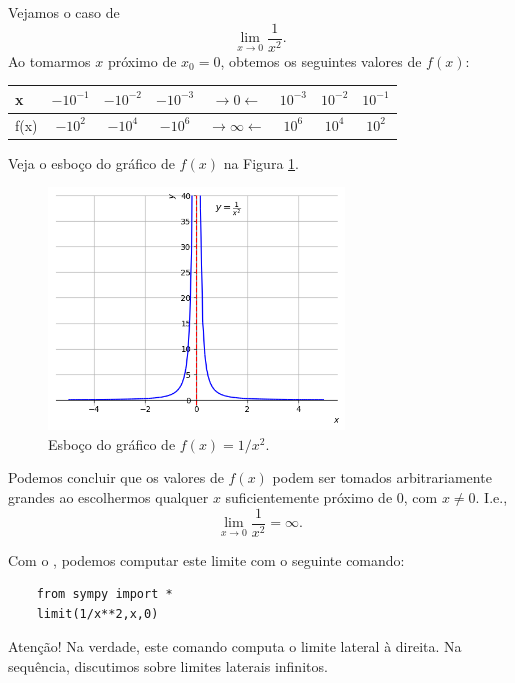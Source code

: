 \begin{ex}
  Vejamos o caso de
  \begin{equation}
    \lim_{x\to 0} \frac{1}{x^2}.
  \end{equation}
  Ao tomarmos $x$ próximo de $x_0=0$, obtemos os seguintes valores de $f(x)$:
  \begin{center}
    \begin{tabular}[H]{l|ccc|c|ccc}
      x & $-10^{-1}$ & $-10^{-2}$ & $-10^{-3}$ & $\rightarrow 0 \leftarrow$ & $10^{-3}$ & $10^{-2}$ & $10^{-1}$ \\\hline
      f(x) & $-10^{2}$ & $-10^{4}$ & $-10^{6}$ & $\rightarrow \infty \leftarrow$ & $10^{6}$ & $10^{4}$ & $10^{2}$
    \end{tabular}
  \end{center}
  Veja o esboço do gráfico de $f(x)$ na Figura \ref{fig:ex_liminf_1x2}.

\begin{figure}[H]
  \centering
  \includegraphics[width=0.7\textwidth]{./cap_lim/dados/fig_ex_liminf_1x2/fig_ex_liminf_1x2}
  \caption{Esboço do gráfico de $f(x)=1/x^2$.}
  \label{fig:ex_liminf_1x2}
\end{figure}  

  Podemos concluir que os valores de $f(x)$ podem ser tomados arbitrariamente grandes ao escolhermos qualquer $x$ suficientemente próximo de $0$, com $x\neq 0$. I.e.,
  \begin{equation}
    \lim_{x\to 0}\frac{1}{x^2} = \infty.
  \end{equation}

  \ifispython
  Com o {\sympy}, podemos computar este limite com o seguinte comando:
  \begin{lstlisting}
    from sympy import *
    limit(1/x**2,x,0)
  \end{lstlisting}
  Atenção! Na verdade, este comando computa o limite lateral à direita. Na sequência, discutimos sobre limites laterais infinitos.
  \fi
\end{ex}

